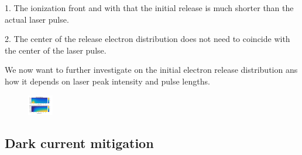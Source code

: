 1. The ionization front and with that the initial release is much shorter than the actual laser pulse.

2. The center of the release electron distribution does not need to coincide with the center of the laser pulse.


We now want to further investigate on the initial electron release distribution ans how it depends on laser peak intensity and pulse lengths.


\begin{figure}[h]
\begin{center}
\includegraphics[width=0.1\textwidth]{theory/images/edited/IonFrontVariation.pdf}
\end{center}
\end{figure}

\subsection{Dark current mitigation}

